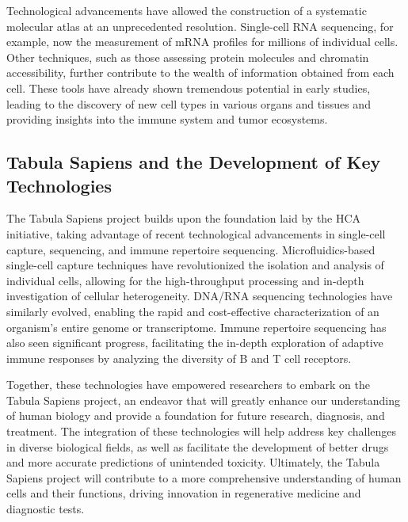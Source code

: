 Technological advancements have allowed the construction of a systematic molecular atlas at an unprecedented resolution. Single-cell RNA sequencing, for example, now the measurement of  mRNA profiles for millions of individual cells\cite{svensson2017power}. Other techniques, such as those assessing protein molecules\cite{stoeckius2017simultaneous} and chromatin accessibility\cite{buenrostro2015atac}, further contribute to the wealth of information obtained from each cell. These tools have already shown tremendous potential in early studies, leading to the discovery of new cell types in various organs and tissues and providing insights into the immune system and tumor ecosystems\cite{regev2017human}.

\subsection{Tabula Sapiens and the Development of Key Technologies}

The Tabula Sapiens project builds upon the foundation laid by the HCA initiative, taking advantage of recent technological advancements in single-cell capture, sequencing, and immune repertoire sequencing. Microfluidics-based single-cell capture techniques have revolutionized the isolation and analysis of individual cells, allowing for the high-throughput processing and in-depth investigation of cellular heterogeneity\cite{macosko2015highly}. DNA/RNA sequencing technologies have similarly evolved, enabling the rapid and cost-effective characterization of an organism's entire genome or transcriptome\cite{goodwin2016coming}. Immune repertoire sequencing has also seen significant progress, facilitating the in-depth exploration of adaptive immune responses by analyzing the diversity of B and T cell receptors\cite{georgiou_promise_2014}.

Together, these technologies have empowered researchers to embark on the Tabula Sapiens project, an endeavor that will greatly enhance our understanding of human biology and provide a foundation for future research, diagnosis, and treatment. The integration of these technologies will help address key challenges in diverse biological fields, as well as facilitate the development of better drugs and more accurate predictions of unintended toxicity. Ultimately, the Tabula Sapiens project will contribute to a more comprehensive understanding of human cells and their functions, driving innovation in regenerative medicine and diagnostic tests.

